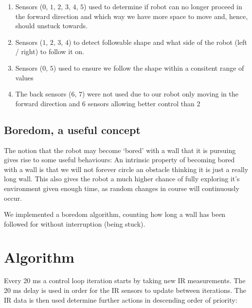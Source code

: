 \documentclass[11pt, a4paper]{article}
\begin{document}
\begin{enumerate}

	\item Sensors ($0$, $1$, $2$, $3$, $4$, $5$) used to determine if robot can no longer proceed in the 
forward direction and which way we have more space to move and, hence, should unstuck towards.

	\item Sensors ($1$, $2$, $3$, $4$) to detect followable shape and what side of the robot (left / right) to follow it on. 

	\item Sensors ($0$, $5$) used to ensure we follow the shape within a consitent range of values

	\item The back sensors ($6$, $7$) were not used due to our robot only moving in the forward direction 
and 6 sensors allowing better control than 2

\end{enumerate}

\subsection{Boredom, a useful concept}

The notion that the robot may become `bored' with a wall that it is pursuing gives 
rise to some useful behaviours: An intrinsic property of becoming bored with a wall 
is that we will not forever circle an obstacle thinking it is just a really long wall. 
This also gives the robot a much higher chance of fully exploring it's environment 
given enough time, as random changes in course will continuously occur.

We implemented a boredom algorithm, counting how long a wall has been followed for without interruption (being stuck).

\section{Algorithm}

Every 20 ms a control loop iteration starts by taking new IR measurements. The 20 ms delay is used 
in order for the IR sensors to update between iterations. The IR data is then used 
determine further actions in descending order of priority:
\end{document}
